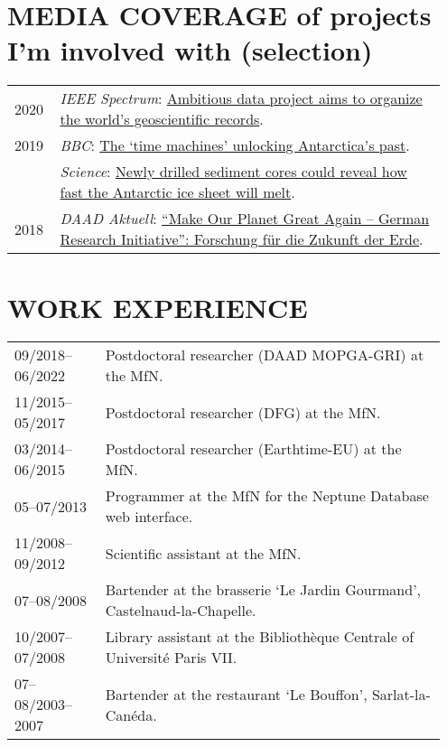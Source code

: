 \documentclass[11pt, a4paper]{article}
\begin{document}
\section[MEDIA COVERAGE]{MEDIA COVERAGE \textnormal{\footnotesize{ of projects I'm involved with (selection)}}}
\begin{longtable}{p{0.1\linewidth} P{0.85\linewidth}}
2020 & \emph{IEEE Spectrum}: \href{https://spectrum.ieee.org/computing/software/ambitious-data-project-aims-to-organize-the-worlds-geoscientific-records}{Ambitious data project aims to organize the world’s geoscientific records}.\\
2019 & \emph{BBC}: \href{https://www.bbc.com/reel/video/p07bvx51/the-time-machines-unlocking-antarctica-s-past}{The `time machines' unlocking Antarctica's past}.\\
  & \emph{Science}: \href{http://dx.doi.org/10.1126/science.aax7040}{Newly drilled sediment cores could reveal how fast the Antarctic ice sheet will melt}.\\
2018 & \emph{DAAD Aktuell}: \href{https://www.daad.de/der-daad/daad-aktuell/de/66800-make-our-planet-great-again-german-research-initiative-forschung-fuer-die-zukunft-der-erde/}{``Make Our Planet Great Again -- German Research Initiative'': Forschung für die Zukunft der Erde}.\\
\end{longtable}

\section{WORK EXPERIENCE}
\begin{longtable}{p{0.2\linewidth} P{0.75\linewidth}}
09/2018--06/2022 & Postdoctoral researcher (DAAD MOPGA-GRI) at the MfN.\\
11/2015--05/2017 & Postdoctoral researcher (DFG) at the MfN.\\
03/2014--06/2015 & Postdoctoral researcher (Earthtime-EU) at the MfN.\\
05--07/2013 & Programmer at the MfN for the Neptune Database web interface.\\
11/2008--09/2012 & Scientific assistant at the MfN.\\
07--08/2008 & Bartender at the brasserie `Le Jardin Gourmand', Castelnaud-la-Chapelle.\\
10/2007--07/2008 & Library assistant at the Biblioth\`{e}que Centrale of Universit\'{e} Paris VII.\\
07--08/2003--2007 & Bartender at the restaurant `Le Bouffon', Sarlat-la-Can\'{e}da.\\
\end{longtable}
\end{document}

